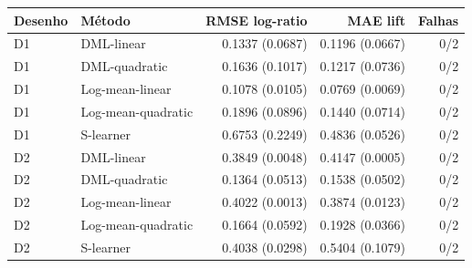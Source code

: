 \begin{tabular}{llrrr}
\toprule
Desenho & Método & RMSE log-ratio & MAE lift & Falhas \\
\midrule
D1 & DML-linear & 0.1337 (0.0687) & 0.1196 (0.0667) & 0/2 \\
D1 & DML-quadratic & 0.1636 (0.1017) & 0.1217 (0.0736) & 0/2 \\
D1 & Log-mean-linear & 0.1078 (0.0105) & 0.0769 (0.0069) & 0/2 \\
D1 & Log-mean-quadratic & 0.1896 (0.0896) & 0.1440 (0.0714) & 0/2 \\
D1 & S-learner & 0.6753 (0.2249) & 0.4836 (0.0526) & 0/2 \\
D2 & DML-linear & 0.3849 (0.0048) & 0.4147 (0.0005) & 0/2 \\
D2 & DML-quadratic & 0.1364 (0.0513) & 0.1538 (0.0502) & 0/2 \\
D2 & Log-mean-linear & 0.4022 (0.0013) & 0.3874 (0.0123) & 0/2 \\
D2 & Log-mean-quadratic & 0.1664 (0.0592) & 0.1928 (0.0366) & 0/2 \\
D2 & S-learner & 0.4038 (0.0298) & 0.5404 (0.1079) & 0/2 \\
\bottomrule
\end{tabular}
